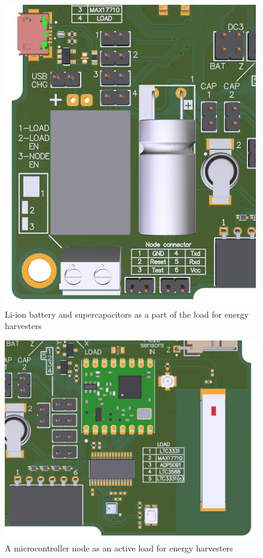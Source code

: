 \documentclass[12pt,a4paper]{article}
\begin{document}
\begin{figure}[ht!]
\includegraphics[scale=0.75]{batteryload.png}
\caption{Li-ion battery and supercapacitors as a part of the load for energy harvesters}
\label{fig:batteryload}
\end{figure} 

\begin{figure}[ht!]
\includegraphics[scale=0.75]{activeload.png}
\caption{A microcontroller node as an active load for energy harvesters}
\label{fig:activeload}
\end{figure}
\end{document}
